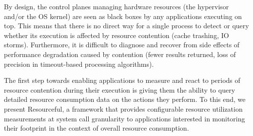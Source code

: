 \documentclass[letterpaper,twocolumn,10pt]{article}
\newcommand{\pname}{Resourceful}
\newcommand{\lnote}[1]{\textcolor{red}{[\textit{#1}]}} %
\begin{document}
By design, the control planes managing hardware resources (the hypervisor and/or
the OS kernel) are seen as black boxes by any applications executing on top.
This means that there is no direct way for a single process to detect or query
whether its execution is affected by resource contention (cache trashing, IO
storms). Furthermore, it is difficult to diagnose and recover from side effects
of performance degradation caused by contention (fewer results returned, loss of
precision in timeout-based processing algorithms).



The first step towards enabling applications to measure and react to periods of
resource contention during their execution is giving them the ability to query
detailed resource consumption data on the actions they perform. To this end, we
present \pname, a framework that provides configurable resource utilization
measurements at system call granularity to applications interested in monitoring
their footprint in the context of overall resource consumption.

\end{document}
